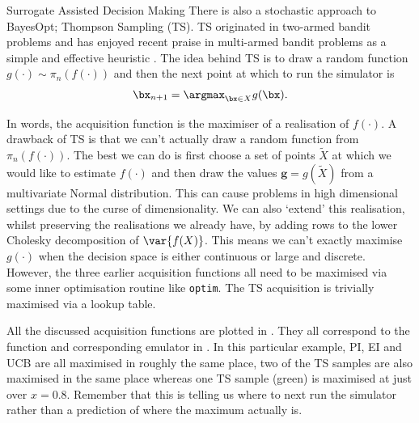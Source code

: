 \begin{chapter}{Surrogate Assisted Decision Making \label{Chap:optimisation}}
There is also a stochastic approach to BayesOpt; Thompson Sampling (TS). TS originated in two-armed bandit problems \citep{Thompson1933} and has enjoyed recent praise in multi-armed bandit problems as a simple and effective heuristic \citep{Scott2010, Chapelle2011}. The idea behind TS is to draw a random function $g(\cdot) \sim \pi_n(f(\cdot))$ and then the next point at which to run the simulator is
\begin{equation}
  \bx_{n+1} = \argmax_{\bx \in X} g(\bx).
\end{equation}

In words, the acquisition function is the maximiser of a realisation of $f(\cdot)$. A drawback of TS is that we can't actually draw a random function from $\pi_n(f(\cdot) )$. The best we can do is first choose a set of points $\tilde{X}$ at which we would like to estimate $f(\cdot)$ and then draw the values $\bm{g} = g(\tilde{X})$ from a multivariate Normal distribution. This can cause problems in high dimensional settings due to the curse of dimensionality. We can also `extend' this realisation, whilst preserving the realisations we already have, by adding rows to the lower Cholesky decomposition of $\var \{ f(X) \}$. This means we can't exactly maximise $g(\cdot)$ when the decision space is either continuous or large and discrete. However, the three earlier acquisition functions all need to be maximised via some inner optimisation routine like \verb|optim|. The TS acquisition is trivially maximised via a lookup table.

All the discussed acquisition functions are plotted in . They all correspond to the function and corresponding emulator in . In this particular example, PI, EI and UCB are all maximised in roughly the same place, two of the TS samples are also maximised in the same place whereas one TS sample (green) is maximised at just over $x= 0.8$. Remember that this is telling us where to next run the simulator rather than a prediction of where the maximum actually is.


\end{chapter}
